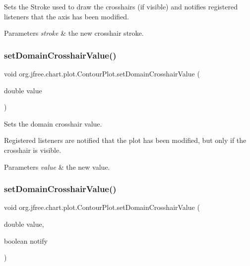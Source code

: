 Sets the Stroke used to draw the crosshairs (if visible) and notifies registered listeners that the axis has been modified.


\begin{DoxyParams}{Parameters}
{\em stroke} & the new crosshair stroke. \\
\hline
\end{DoxyParams}
\mbox{\label{classorg_1_1jfree_1_1chart_1_1plot_1_1_contour_plot_a312c906180718002f23fa3772d24cf5c}} 
\subsubsection{\texorpdfstring{set\+Domain\+Crosshair\+Value()}{setDomainCrosshairValue()}\hspace{0.1cm}{\footnotesize\ttfamily [1/2]}}
{\footnotesize\ttfamily void org.\+jfree.\+chart.\+plot.\+Contour\+Plot.\+set\+Domain\+Crosshair\+Value (\begin{DoxyParamCaption}\item[{double}]{value }\end{DoxyParamCaption})}

Sets the domain crosshair value. 

Registered listeners are notified that the plot has been modified, but only if the crosshair is visible.


\begin{DoxyParams}{Parameters}
{\em value} & the new value. \\
\hline
\end{DoxyParams}
\mbox{\label{classorg_1_1jfree_1_1chart_1_1plot_1_1_contour_plot_ae52230aa19df4d6013a7bd0323eec5cc}} 
\subsubsection{\texorpdfstring{set\+Domain\+Crosshair\+Value()}{setDomainCrosshairValue()}\hspace{0.1cm}{\footnotesize\ttfamily [2/2]}}
{\footnotesize\ttfamily void org.\+jfree.\+chart.\+plot.\+Contour\+Plot.\+set\+Domain\+Crosshair\+Value (\begin{DoxyParamCaption}\item[{double}]{value,  }\item[{boolean}]{notify }\end{DoxyParamCaption})}


